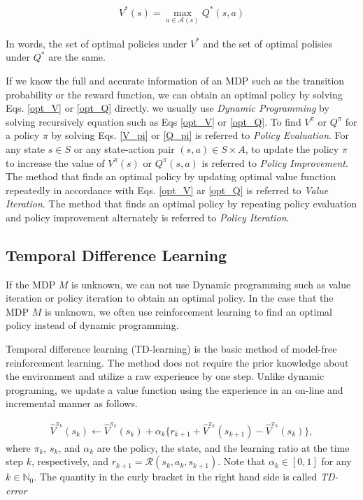 \begin{align*}
  V^{\ast}(s) = \max_{a \in \mathcal{A}(s)} Q^{\ast}(s,a)
\end{align*}

In words, the set of optimal policies under $V^{\ast}$ and the set of optimal polisies under $Q^{\ast}$ are the same.

If we know the full and accurate information of an MDP such as the transition probability or the reward function, we can obtain an optimal policy by solving Eqs. \ref{opt_V} or \ref{opt_Q} directly. we usually use {\it Dynamic Programming} by solving recursively equation such as Eqs \ref{opt_V} or \ref{opt_Q}. To find $V^{\pi}$ or $Q^{\pi}$ for a policy $\pi$ by solving Eqs. \ref{V_pi} or \ref{Q_pi} is referred to {\it Policy Evaluation}. For any state $s \in S$ or any state-action pair $(s,a) \in S \times A$, to update the policy $\pi$ to increase the value of $V^{\pi}(s)$ or $Q^{\pi}(s,a)$ is referred to {\it Policy Improvement}. The method that finds an optimal policy by updating optimal value function repeatedly in accordance with Eqs. \ref{opt_V} ar \ref{opt_Q} is referred to {\it Value Iteration}. The method that finds an optimal policy by repeating policy evaluation and policy improvement alternately is referred to {\it Policy Iteration}.

\subsection{Temporal Difference Learning}

If the MDP $M$ is unknown, we can not use Dynamic programming such as value iteration or policy iteration to obtain an optimal policy. In the case that the MDP $M$ is unknown, we often use   reinforcement learning to find an optimal policy instead of dynamic programming.

Temporal difference learning (TD-learning) is the basic method of model-free reinforcement learning. The method does not require the prior knowledge about the environment and utilize a raw experience by one step. Unlike dynamic programing, we update a value function using the experience in an on-line and incremental manner as follows.

\begin{align}
  \hat{V}^{\pi_k}(s_k) \leftarrow \hat{V}^{\pi_k}(s_k) + \alpha_k \{ r_{k+1} + \hat{V}^{\pi_k}(s_{k+1}) - \hat{V}^{\pi_k}(s_k) \},
\end{align}
where $\pi_k$, $s_k$, and $\alpha_k$ are the policy, the state, and the learning ratio at the time step $k$, respectively, and $r_{k+1} = \mathcal{R}(s_k, a_k, s_{k+1})$. Note that $\alpha_k \in [0,1]$ for any $k \in \mathbb{N}_0$. The quantity in the curly bracket in the right hand side is called {\it TD-error}

